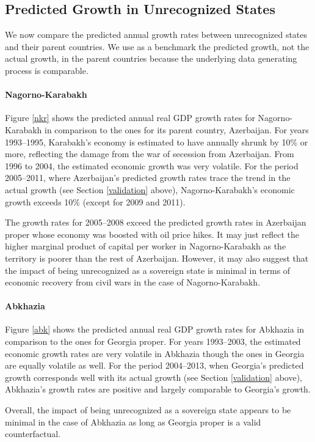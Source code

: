 \documentclass[12pt,a4paper]{article}%
\begin{document}
\subsection{Predicted Growth in Unrecognized States}
We now compare the predicted annual growth rates between unrecognized states and their parent countries. 
We use as a benchmark the predicted growth, not the actual growth, in the parent countries because the underlying data generating process is comparable.

\paragraph{Nagorno-Karabakh}
Figure \ref{nkr} shows the predicted annual real GDP growth rates for Nagorno-Karabakh in comparison to the ones for its parent country, Azerbaijan. 
For years 1993--1995, Karabakh's economy is estimated to have annually shrunk by 10\% or more, reflecting the damage from the war of secession from Azerbaijan. 
From 1996 to 2004, the estimated economic growth was very volatile.
For the period 2005--2011, where Azerbaijan's predicted growth rates trace the trend in the actual growth (see Section \ref{validation} above), Nagorno-Karabakh's economic growth exceeds 10\% (except for 2009 and 2011). 

The growth rates for 2005--2008 exceed the predicted growth rates in Azerbaijan proper whose economy was boosted with oil price hikes.
It may just reflect the higher marginal product of capital per worker in Nagorno-Karabakh as the territory is poorer than the rest of Azerbaijan. 
However, it may also suggest that the impact of being unrecognized as a sovereign state is minimal in terms of economic recovery from civil wars in the case of Nagorno-Karabakh.

\paragraph{Abkhazia}
Figure \ref{abk} shows the predicted annual real GDP growth rates for Abkhazia in comparison to the ones for Georgia proper. 
For years 1993--2003, the estimated economic growth rates are very volatile in Abkhazia though the ones in Georgia are equally volatile as well.
For the period 2004--2013, when Georgia's predicted growth corresponds well with its actual growth (see Section \ref{validation} above), Abkhazia's growth rates are positive and largely comparable to Georgia's growth.   

Overall, the impact of being unrecognized as a sovereign state appears to be minimal in the case of Abkhazia as long as Georgia proper is a valid counterfactual.
\end{document}

